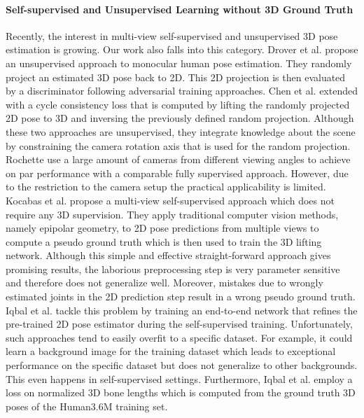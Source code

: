 \documentclass[final]{cvpr}
\begin{document}
\paragraph{Self-supervised and Unsupervised Learning without 3D Ground Truth}
Recently, the interest in multi-view self-supervised and unsupervised 3D pose estimation is growing.
Our work also falls into this category.
Drover et al. \cite{drover2018can} propose an unsupervised approach to monocular human pose estimation.
They randomly project an estimated 3D pose back to 2D.
This 2D projection is then evaluated by a discriminator following adversarial training approaches.
Chen et al. \cite{chen2019unsupervised} extended \cite{drover2018can} with a cycle consistency loss that is computed by lifting the randomly projected 2D pose to 3D and inversing the previously defined random projection.
Although these two approaches are unsupervised, they integrate knowledge about the scene by constraining the camera rotation axis that is used for the random projection.
Rochette \etal \cite{rochette2019weakly} use a large amount of cameras from different viewing angles to achieve on par performance with a comparable fully supervised approach. 
However, due to the restriction to the camera setup the practical applicability is limited.
Kocabas et al. \cite{kocabas2019epipolar} propose a multi-view self-supervised approach which does not require any 3D supervision.
They apply traditional computer vision methods, namely epipolar geometry, to 2D pose predictions from multiple views to compute a pseudo ground truth which is then used to train the 3D lifting network.
Although this simple and effective straight-forward approach gives promising results, the laborious preprocessing step is very parameter sensitive and therefore does not generalize well. Moreover, mistakes due to wrongly estimated joints in the 2D prediction step result in a wrong pseudo ground truth.
Iqbal et al. \cite{Iqbal_2020_CVPR} tackle this problem by training an end-to-end network that refines the pre-trained 2D pose estimator during the self-supervised training.
Unfortunately, such approaches tend to easily overfit to a specific dataset.
For example, it could learn a background image for the training dataset which leads to exceptional performance on the specific dataset but does not generalize to other backgrounds.
This even happens in self-supervised settings.
Furthermore, Iqbal et al. \cite{Iqbal_2020_CVPR} employ a loss on normalized 3D bone lengths which is computed from the ground truth 3D poses of the Human3.6M training set. 
\end{document}
